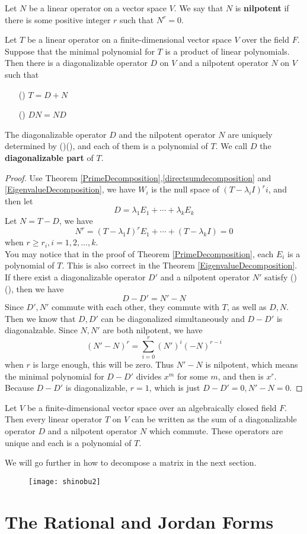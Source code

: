 \documentclass{article}
\begin{document}
\begin{dde}
	Let $N$ be a linear operator on a vector space $V$. We say that $N$ is \textbf{nilpotent} if there is some positive integer $r$ such that $N^r=0$.
\end{dde}
\begin{thm}
	Let $T$ be a linear operator on a finite-dimensional vector space $V$ over the field $F$. Suppose that the minimal polynomial for $T$ is a product of linear polynomials. Then there is a diagonalizable operator $D$ on $V$ and a nilpotent operator $N$ on $V$ such that
	\begin{enumerate}
		\item [(\romannumeral1)]$T=D+N$
		\item [(\romannumeral2)]$DN=ND$
	\end{enumerate}
	The diagonalizable operator $D$ and the nilpotent operator $N$ are uniquely determined by ()(), and each of them is a polynomial of $T$. We call $D$ the \textbf{diagonalizable part} of $T$.
\end{thm}
\begin{proof}
	Use Theorem \ref{PrimeDecomposition},\ref{directsumdecomposition} and \ref{EigenvalueDecomposition}, we have $W_i$ is the null space of $(T-\lambda_i I)^r{i}$, and then let
	\[D=\lambda_1E_1+\cdots+\lambda_kE_k\]
	Let $N=T-D$, we have
	\[N^r=(T-\lambda_1 I)^rE_1+\cdots+(T-\lambda_k I)=0\]
	when $r\ge r_i,i=1,2,\dots,k$.\\
	You may notice that in the proof of Theorem \ref{PrimeDecomposition}, each $E_i$ is a polynomial of $T$. This is also correct in the Theorem \ref{EigenvalueDecomposition}.\\
	If there exist a diagonalizable operator $D'$ and a nilpotent operator $N'$ satisfy ()(), then we have
	\[D-D'=N'-N\]
	Since $D',N'$ commute with each other, they commute with $T$, as well as $D,N$. Then we know that $D,D'$ can be diagonalized simultaneously and $D-D'$ is diagonalzable. Since $N,N'$ are both nilpotent, we have
	\[(N'-N)^r=\sum\limits_{i=0}^r(N')^i(-N)^{r-i}\]
	when $r$ is large enough, this will be zero. Thus $N'-N$ is nilpotent, which means the minimal polynomial for $D-D'$ divides $x^m$ for some $m$, and then is $x^r$. Because $D-D'$ is diagonalizable, $r=1$, which is just $D-D'=0,N'-N=0$.
\end{proof}
\begin{coro}
	Let $V$ be a finite-dimensional vector space over an algebraically closed field $F$. Then every linear operator $T$ on $V$ can be written as the sum of a diagonalizable operator $D$ and a nilpotent operator $N$ which commute. These operators are unique and each is a polynomial of $T$.
\end{coro}
We will go further in how to decompose a matrix in the next section.
\begin{figure}[htbp]
	\centering
	\texttt{[image: shinobu2]}
\end{figure}
\newpage
\section{The Rational and Jordan Forms}
\end{document}
